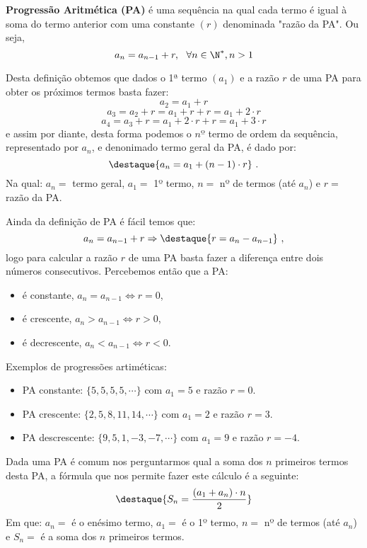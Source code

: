  \colorbox{azul}{
 \begin{minipage}{14.5cm}
 \begin{center}
  \textbf{Progressão Aritmética (PA)} é uma sequência na qual cada termo é igual à soma do termo anterior com uma constante $(r)$ denominada "razão da PA". Ou seja,
  \[a_{n}= a_{n-1} + r, \ \ \forall n \in \N^{\ast}, n > 1\]
 \end{center}
 \end{minipage}}
 \vskip0.3cm

 Desta definição obtemos que dados o 1ª termo $(a_1)$ e a razão $r$ de uma PA para obter os próximos termos basta fazer:
 \[a_2= a_1 + r\]
 \[a_3= a_2 + r= a_1 + r + r= a_1 + 2 \cdot r\]
 \[a_4= a_3 + r= a_1 + 2 \cdot r + r= a_1 + 3 \cdot r\]
 e assim por diante, desta forma podemos o $nº$ termo de ordem da sequência, representado por $a_n$, e denonimado termo geral da PA, é dado por:
 \[\destaque{a_n= a_1 + (n-1) \cdot r} \ .\]
 Na qual: $a_n=$ termo geral, $a_1=$ 1º termo, $n=$ nº de termos (até $a_n$) e $r=$ razão da PA.

 Ainda da definição de PA é fácil temos que:
 \[a_{n}= a_{n-1} + r \Rightarrow
 \destaque{r= a_{n} - a_{n-1}} \ ,\]
 logo para calcular a razão $r$ de uma PA basta fazer a diferença entre dois números consecutivos. Percebemos então que a PA:
 \begin{itemize}
  \item é constante, $a_n= a_{n-1} \Leftrightarrow r= 0$,
  \item é crescente, $a_n > a_{n-1} \Leftrightarrow r > 0$,
  \item é decrescente, $a_n < a_{n-1} \Leftrightarrow r < 0$.
 \end{itemize}

 \begin{exem} Exemplos de progressões artiméticas:
  \begin{itemize}
   \item PA constante: $\{5, 5, 5, 5, \cdots\}$ com $a_1= 5$ e razão $r= 0$.
   \item PA crescente: $\{2, 5, 8, 11, 14, \cdots\}$ com $a_1= 2$ e razão $r= 3$.
   \item PA descrescente: $\{9, 5, 1, -3, -7, \cdots\}$ com $a_1= 9$ e razão $r= -4$.
  \end{itemize}
 \end{exem}

 Dada uma PA é comum nos perguntarmos qual a soma dos $n$ primeiros termos desta PA, a fórmula que nos permite fazer este cálculo é a seguinte:
 \[\destaque{S_n= \frac{(a_1 + a_n)\cdot n}{2}}\]
 Em que: $a_n=$ é o enésimo termo, $a_1=$ é o 1º termo, $n=$ nº de termos (até $a_n$) e $S_n=$ é a soma dos $n$ primeiros termos.



